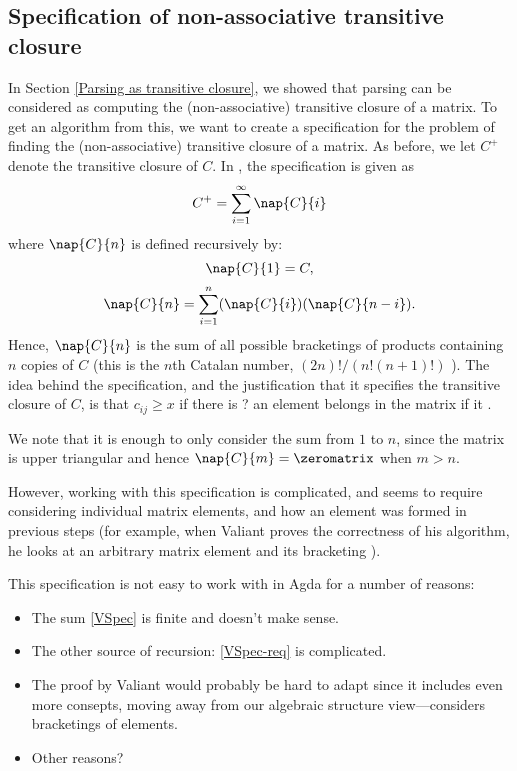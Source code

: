 \subsection{Specification of non-associative transitive closure}
In Section \ref{Parsing as transitive closure}, we showed that parsing can be considered as computing the (non-associative) transitive closure of a matrix. To get an algorithm from this, we want to create a specification for the problem of finding the (non-associative) transitive closure of a matrix. As before, we let $C^+$ denote the transitive closure of $C$. In \cite{Valiant}, the specification is given as
\begin{equation}
  \label{VSpec}
  C^+ = \sum_{i = 1}^{\infty}\nap{C}{i}
\end{equation}
where $\nap{C}{n}$ is defined recursively by:
\begin{equation}
  \nap{C}{1} = C,
\end{equation}
\begin{equation}
  \label{VSpec-rec}
  \nap{C}{n} = \sum_{i = 1}^n(\nap{C}{i})(\nap{C}{n-i}).
\end{equation}
Hence, $\nap{C}{n}$ is the sum of all possible bracketings of products containing $n$ copies of $C$ (this is the $n$th Catalan number, $(2n)!/(n!(n+1)!)$ \cite{mathworld-catalan}).
The idea behind the specification, and the justification that it specifies the transitive closure of $C$, is that $c_{ij} \ge x$ if there is ? an element belongs in the matrix if it .

We note that it is enough to only consider the sum from $1$ to $n$, since the matrix is upper triangular and hence $\nap{C}{m} = \zeromatrix$ when $m > n$.

However, working with this specification is complicated, and seems to require considering individual matrix elements, and how an element was formed in previous steps (for example, when Valiant proves the correctness of his algorithm, he looks at an arbitrary matrix element and its bracketing \cite{Valiant} ). 

This specification is not easy to work with in Agda for a number of reasons:
\begin{itemize}
\item The sum \eqref{VSpec} is finite and doesn't make sense.
\item The other source of recursion: \eqref{VSpec-req} is complicated.
\item The proof by Valiant would probably be hard to adapt since it includes even more consepts, moving away from our algebraic structure view---considers bracketings of elements.
\item Other reasons?
\end{itemize}

